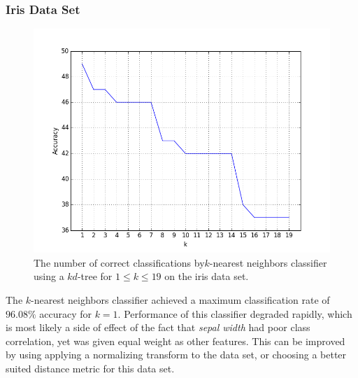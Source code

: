 \documentclass{article}
\numberwithin{figure}{section}
\newcommand{\imgwidth}{.8\textwidth}
\begin{document}
\subsubsection{Iris Data Set}
\begin{figure}[H]
\centering
\includegraphics[width=\imgwidth]{knn_kd_iris}
\caption{The number of correct classifications by$k$-nearest neighbors classifier using a $kd$-tree for $1 \leq k \leq 19$ on the iris data set.}
\label{knn:kd:iris}
\end{figure}

The $k$-nearest neighbors classifier achieved a maximum classification rate of $96.08\%$ accuracy for $k=1$. Performance of this classifier degraded rapidly, which is most likely a side of effect of the fact that \emph{sepal width} had poor class correlation, yet was given equal weight as other  features. This can be improved by using applying a normalizing transform to the data set, or choosing a better suited distance metric for this data set.

\end{document}

